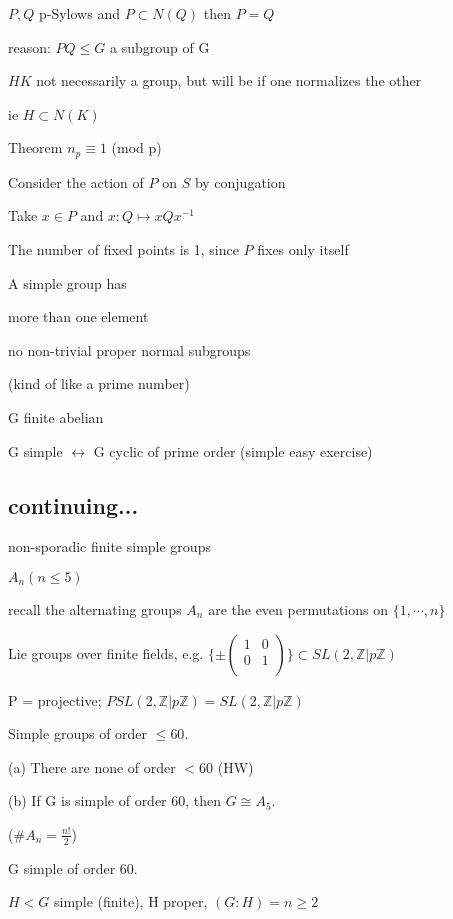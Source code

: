 \documentclass[12pt]{article}
\newcommand{\inv}{^{-1}}
\begin{document}
\noindent
$P, Q$ p-Sylows and $P \subset N(Q)$ then $P = Q$

reason: $PQ \leq G$ a subgroup of G

$HK$ not necessarily a group, but will be if one normalizes the other

ie $H \subset N(K)$

\noindent
Theorem $n_p \equiv 1$ (mod p)

Consider the action of $P$ on $S$ by conjugation

Take $x \in P$ and $x: Q \mapsto xQx\inv$

The number of fixed points is 1, since $P$ fixes only itself

\noindent
A simple group has

more than one element

no non-trivial proper normal subgroups

(kind of like a prime number)

\noindent
G finite abelian

G simple $\leftrightarrow$ G cyclic of prime order (simple easy exercise)

\subsection{continuing...}

\noindent
non-sporadic finite simple groups

$A_n (n \leq 5)$

recall the alternating groups $A_n$ are the even permutations on $\{1, \cdots, n\}$

Lie groups over finite fields, e.g. $\{\pm \begin{pmatrix} 1 & 0 \\ 0 & 1 \\ \end{pmatrix}\} \subset SL(2, \mathds{Z}|p\mathds{Z})$

P = projective; $PSL(2, \mathds{Z}|p\mathds{Z}) = SL(2, \mathds{Z}|p\mathds{Z})$

\noindent
Simple groups of order $\leq 60$.

(a) There are none of order $< 60$ (HW)

(b) If G is simple of order 60, then $G \cong A_5$.

($\#A_n = \frac{n!}{2}$)

\noindent
G simple of order 60.

$H < G$ simple (finite), H proper, $(G: H) = n \geq 2$
\end{document}
